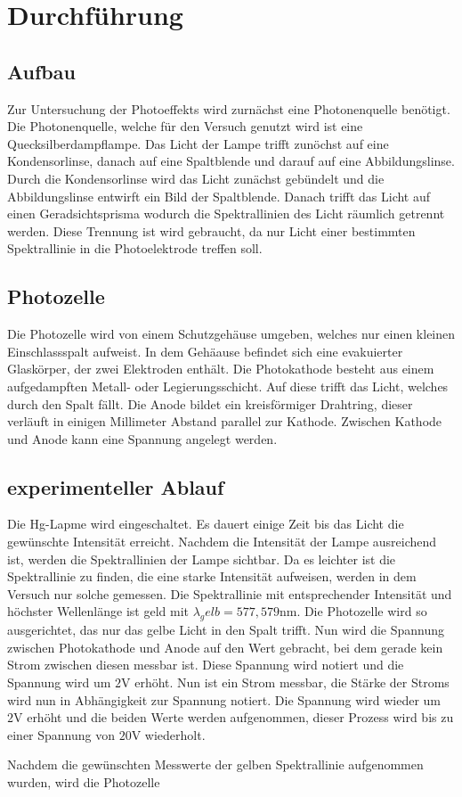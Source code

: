 \section{Durchführung}
\label{sec:Durchführung}
\subsection{Aufbau}
Zur Untersuchung der Photoeffekts wird zurnächst eine Photonenquelle benötigt.
Die Photonenquelle, welche für den Versuch genutzt wird ist eine Quecksilberdampflampe.
Das Licht der Lampe trifft zunöchst auf eine Kondensorlinse, danach auf eine Spaltblende und darauf auf eine Abbildungslinse.
Durch die Kondensorlinse wird das Licht zunächst gebündelt und die Abbildungslinse entwirft ein Bild der Spaltblende.
Danach trifft das Licht auf einen Geradsichtsprisma wodurch die Spektrallinien des Licht räumlich getrennt werden.
Diese Trennung ist wird gebraucht, da nur Licht einer bestimmten Spektrallinie in die Photoelektrode treffen soll.

\subsection{Photozelle}
Die Photozelle wird von einem Schutzgehäuse umgeben, welches nur einen kleinen Einschlassspalt aufweist.
In dem Gehäause befindet sich eine evakuierter Glaskörper, der zwei Elektroden enthält.
Die Photokathode besteht aus einem aufgedampften Metall- oder Legierungsschicht.
Auf diese trifft das Licht, welches durch den Spalt fällt.
Die Anode bildet ein kreisförmiger Drahtring, dieser verläuft in einigen Millimeter Abstand parallel zur Kathode.
Zwischen Kathode und Anode kann eine Spannung angelegt werden.

\subsection{experimenteller Ablauf}
Die Hg-Lapme wird eingeschaltet.
Es dauert einige Zeit bis das Licht die gewünschte Intensität erreicht.
Nachdem die Intensität der Lampe ausreichend ist, werden die Spektrallinien der Lampe sichtbar.
Da es leichter ist die Spektrallinie zu finden, die eine starke Intensität aufweisen, werden in dem Versuch nur solche gemessen.
Die Spektrallinie mit entsprechender Intensität und höchster Wellenlänge ist geld mit $\lambda_gelb = 577,579 \si{\nano\meter}$.
Die Photozelle wird so ausgerichtet, das nur das gelbe Licht in den Spalt trifft.
Nun wird die Spannung zwischen Photokathode und Anode auf den Wert gebracht, bei dem gerade kein Strom zwischen diesen messbar ist.
Diese Spannung wird notiert und die Spannung wird um $2\si{\V}$ erhöht.
Nun ist ein Strom messbar, die Stärke der Stroms wird nun in Abhängigkeit zur Spannung notiert.
Die Spannung wird wieder um $2\si{\V}$ erhöht und die beiden Werte werden aufgenommen, dieser Prozess wird bis zu einer Spannung von $20\si{\V}$ wiederholt.


Nachdem die gewünschten Messwerte der gelben Spektrallinie aufgenommen wurden, wird die Photozelle 
